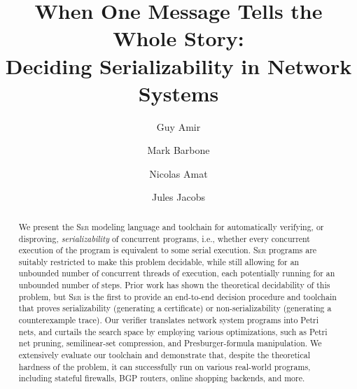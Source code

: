 \documentclass[a4paper]{llncs}
\title{When One Message Tells the Whole Story:\\ Deciding Serializability in Network Systems}
\author{
			Guy Amir \and
			Mark Barbone \and
			Nicolas Amat \and
			Jules Jacobs
		}
\institute{}
\newcommand{\toolname}{\textsc{Ser}}
\let\oldmaketitle\maketitle
\renewcommand{\maketitle}{
  \oldmaketitle
  \pagestyle{plain}  %
  \thispagestyle{plain}  %
}
\begin{document}
\raggedbottom


%	

\maketitle

\begin{abstract}
	We present the \toolname{} modeling language and toolchain for automatically verifying, or disproving, \textit{serializability} of concurrent programs, i.e., whether every concurrent execution of the program is equivalent to some serial execution.
	\toolname{} programs are suitably restricted to make this problem decidable, while still allowing for an unbounded number of concurrent threads of execution, each potentially running for an unbounded number of steps.
	Prior work has shown the theoretical decidability of this problem, but \toolname{} is the first to provide an end-to-end decision procedure and toolchain that proves serializability (generating a certificate) or non-serializability (generating a counterexample trace).
	Our verifier translates network system programs into Petri nets, and curtails the search space by employing various optimizations, such as Petri net pruning, semilinear-set compression, and Presburger-formula manipulation.
	We extensively evaluate our toolchain and demonstrate that, despite the theoretical hardness of the problem, it can successfully run on various real-world programs, including stateful firewalls, BGP routers, online shopping backends, and more.
\end{abstract}












\newpage

{
	
	
}

\newpage
\appendix










\end{document}

